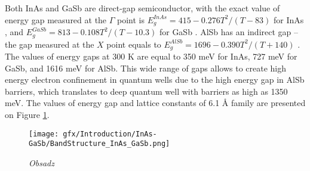 \documentclass[titlepage,a4paper]{book}
\begin{document}
Both InAs and GaSb are direct-gap semiconductor, with the exact value of energy gap measured at the $\Gamma$ point is $E_g^{InAs} = 415-0.276 T^2/(T-83)$ for InAs \cite{Fang_InAs}, and $E_g^{GaSb} = 813 - 0.108 T^2/(T-10.3)$ for GaSb \cite{Wu_GaSb}. AlSb has an indirect gap – the gap measured at the $X$ point equals to $E_g^{AlSb} = 1696 - 0.390 T^2/(T+140)$ \cite{Vurgaftman_AlSb}. The values of energy gaps at 300 K are equal to 350 meV for InAs, 727 meV for GaSb, and 1616 meV for AlSb. This wide range of gaps allows to create high energy electron confinement in quantum wells due to the high energy gap in AlSb barriers, which translates to deep quantum well with barriers as high as 1350 meV. The values of energy gap and lattice constants of 6.1 Å family are presented on Figure \ref{fig:BandStructure_InAs_GaSb}.

\begin{figure}[ht]
	\centering
	\texttt{[image: gfx/Introduction/InAs-GaSb/BandStructure\_InAs\_GaSb.png]}
	\vspace{-10pt}
	\caption{\textit{Obsadz}}
	\label{fig:BandStructure_InAs_GaSb}
\end{figure} 
\end{document}
